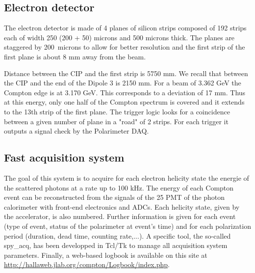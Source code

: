 {\subsection{Electron detector}
\label{sec:compton_edet}

The electron detector is made of 4 planes of silicon strips composed
of 192 strips each of width 250 (200 + 50) microns and 500 microns
thick. The planes are staggered by 200~microns to allow for better
resolution and the first strip of the first plane is about 8 mm away from the
beam. 

Distance between the CIP and the first strip is 5750 mm. We recall that
between the CIP and the end of the Dipole 3 is 2150 mm.
For a beam of 3.362 GeV the Compton
edge is at 3.170 GeV. This corresponds to a deviation of 17 mm. Thus at
this energy, only one half of the Compton spectrum is covered and it extends
to the 13th strip of the first plane.
The trigger logic looks for a coincidence
between a given number of plane in a "road" of 2 strips. For each trigger
it outputs a signal check by the Polarimeter DAQ.

\subsection{Fast acquisition system}
\label{sec:compton_daq}
The goal of this system is to acquire
for each electron helicity state the energie of the scattered photons at a
rate up to 100 kHz. The energy of each Compton event can be
reconstructed from the signals of the 25 PMT of the photon calorimeter
with front-end electronics and ADCs. Each helicity state, given
by the accelerator, is also numbered.
Further information is given for each
event (type of event, status of the polarimeter at event's time) and for
each polarization period (duration, dead time, counting rate,...).
A specific tool, the so-called spy\_acq, has been developped in Tcl/Tk
to manage all acquisition system parameters. Finally, a web-based logbook
is available on this site at \url{http://hallaweb.jlab.org/compton/Logbook/index.php}.

} %

